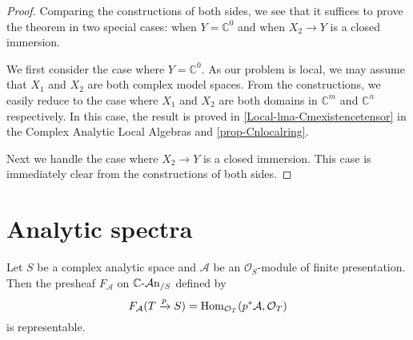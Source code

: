 \begin{proof}
    Comparing the constructions of both sides, we see that it suffices to prove the theorem in two special cases: when $Y=\mathbb{C}^0$ and when $X_2\rightarrow Y$ is a closed immersion. 

    We first consider the case where $Y=\mathbb{C}^0$. As our problem is local, we may assume that $X_1$ and $X_2$ are both complex model spaces. From the constructions, we easily reduce to the case where $X_1$ and $X_2$ are both domains in $\mathbb{C}^m$ and $\mathbb{C}^n$ respectively. In this case, the result is proved in \cref{Local-lma-Cmexistencetensor} in the Complex Analytic Local Algebras and \cref{prop-Cnlocalring}.
    
    Next we handle the case where $X_2\rightarrow Y$ is a closed immersion. This case is immediately clear from the constructions of both sides.
\end{proof}

\section{Analytic spectra}

\begin{proposition}\label{prop-analyticspecrep}
    Let $S$ be a complex analytic space and $\mathcal{A}$ be an $\mathcal{O}_S$-module of finite presentation. Then the presheaf $F_{\mathcal{A}}$ on $\mathbb{C}\text{-}\mathcal{A}\mathrm{n}_{/S}$ defined by
    \[
        F_{\mathcal{A}}(T\xrightarrow{p} S)=\operatorname{Hom}_{\mathcal{O}_T}(p^*\mathcal{A},\mathcal{O}_T)  
    \]
    is representable.
\end{proposition}
 
